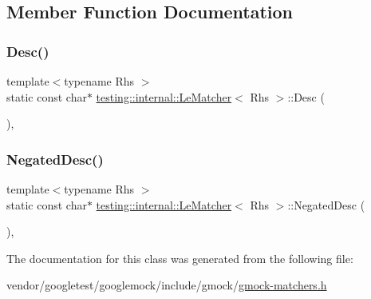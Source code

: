 \subsection{Member Function Documentation}
\mbox{\label{classtesting_1_1internal_1_1_le_matcher_adfef0084cb0f28503a40d7157699519b}} 
\subsubsection{\texorpdfstring{Desc()}{Desc()}}
{\footnotesize\ttfamily template$<$typename Rhs $>$ \\
static const char$\ast$ \hyperlink{classtesting_1_1internal_1_1_le_matcher}{testing\+::internal\+::\+Le\+Matcher}$<$ Rhs $>$\+::Desc (\begin{DoxyParamCaption}{ }\end{DoxyParamCaption})\hspace{0.3cm}{\ttfamily [inline]}, {\ttfamily [static]}}

\mbox{\label{classtesting_1_1internal_1_1_le_matcher_a01dada192b6f7139b66bbc198b3cb03b}} 
\subsubsection{\texorpdfstring{Negated\+Desc()}{NegatedDesc()}}
{\footnotesize\ttfamily template$<$typename Rhs $>$ \\
static const char$\ast$ \hyperlink{classtesting_1_1internal_1_1_le_matcher}{testing\+::internal\+::\+Le\+Matcher}$<$ Rhs $>$\+::Negated\+Desc (\begin{DoxyParamCaption}{ }\end{DoxyParamCaption})\hspace{0.3cm}{\ttfamily [inline]}, {\ttfamily [static]}}



The documentation for this class was generated from the following file\+:\begin{DoxyCompactItemize}
\item 
vendor/googletest/googlemock/include/gmock/\hyperlink{gmock-matchers_8h}{gmock-\/matchers.\+h}\end{DoxyCompactItemize}
